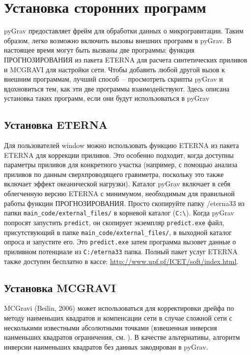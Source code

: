 \chapter[Установка сторонних программ]{Установка сторонних программ}
\label{chap:installing_external_programs}

pyGrav предоставляет фрейм для обработки данных о микрогравитации. Таким
образом, легко возможно включить вызовы внешних программ в pyGrav. В настоящее
время могут быть вызваны две программы: функция ПРОГНОЗИРОВАНИЯ из пакета ETERNA
\cite{wenzel_1996} для расчета синтетических приливов и MCGRAVI \cite{beilin_2006} для
настройки сети. Чтобы добавить любой другой вызов к внешним программам, лучший
способ~-- просмотреть скрипты pyGrav и вдохновиться тем, как эти две программы
взаимодействуют. Здесь описана установка таких программ, если они будут
использоваться в pyGrav

\section[Установка ETERNA]{Установка ETERNA}
\label{sec:eterna_installation}

Для пользователей window можно использовать функцию ETERNA из пакета ETERNA
\cite{wenzel_1996} для коррекции приливов. Это особенно подходит, когда доступны
параметры приливов для конкретного участка (например, с помощью анализа приливов
по данным сверхпроводящего гравиметра, поскольку это также включает эффект
океанической нагрузки). Каталог pyGrav включает в себя облегченную версию ETERNA
с минимумом, необходимым для правильной работы функции ПРОГНОЗИРОВАНИЯ. Просто
скопируйте папку /eterna33 из папки \verb|main_code/external_files/| в корневой каталог
(\verb|C:\|). Когда pyGrav попросят запустить \verb|predict|, он скопирует экземпляр
\verb|predict.exe| файл, присутствующий в папке \verb|main_code/external_files/|, в выходной
каталог опроса и запустите его. Это \verb|predict.exe| затем программа вызовет данные о
приливном потенциале из \verb|C:/eterna33| папка. Полный пакет услуг ETERNA также
доступен бесплатно в кассе: \url{http://www.upf.pf/ICET/soft/index.html}.

\section[Установка MCGRAVI]{Установка MCGRAVI}
\label{sec:mcgravi_installation}

MCGravi (Beilin, 2006) может использоваться для корректировки дрейфа по методу
наименьших квадратов и компенсации сети в случае сложной сети с несколькими
известными абсолютными точками (взвешенная инверсия наименьших квадратов
ограничения, см. \cite{hwang_adjustment_2002}). В качестве альтернативы,
алгоритм инверсии наименьших квадратов без данных \cite{hwang_adjustment_2002}
закодирован в pyGrav.

